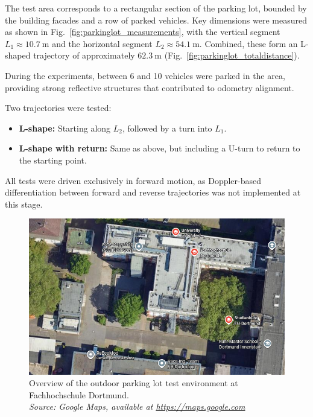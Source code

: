 The test area corresponds to a rectangular section of the parking lot, bounded by the building facades and a row of parked vehicles.  
Key dimensions were measured as shown in Fig.~\ref{fig:parkinglot_measurements}, with the vertical segment $L_1 \approx \SI{10.7}{\meter}$ and the horizontal segment $L_2 \approx \SI{54.1}{\meter}$.  
Combined, these form an L-shaped trajectory of approximately $\SI{62.3}{\meter}$ (Fig.~\ref{fig:parkinglot_totaldistance}).  

During the experiments, between 6 and 10 vehicles were parked in the area, providing strong reflective structures that contributed to odometry alignment.  

Two trajectories were tested:
\begin{itemize}
    \item \textbf{L-shape:} Starting along $L_2$, followed by a turn into $L_1$.
    \item \textbf{L-shape with return:} Same as above, but including a U-turn to return to the starting point.
\end{itemize}

All tests were driven exclusively in forward motion, as Doppler-based differentiation between forward and reverse trajectories was not implemented at this stage.

\begin{figure}[!htbp]
    \centering
    \includegraphics[width=0.9\linewidth]{images/FH_ParkingLot.png}
    \caption{Overview of the outdoor parking lot test environment at Fachhochschule Dortmund.\\
    \textit{Source: Google Maps, available at \url{https://maps.google.com} \cite{googlemaps_fhdo}}}
    \label{fig:parking_lot_overview}
\end{figure}

